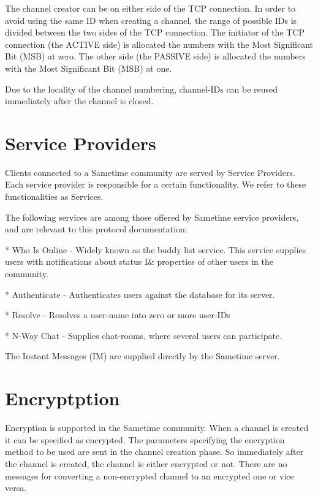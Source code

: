 \documentclass[titlepage,oneside]{book}
\begin{document}
\par{} The channel creator can be on either side of the TCP
connection. In order to avoid using the same ID when creating a
channel, the range of possible IDs is divided between the two sides of
the TCP connection.  The initiator of the TCP connection (the ACTIVE
side) is allocated the numbers with the Most Significant Bit (MSB) at
zero. The other side (the PASSIVE side) is allocated the numbers with
the Most Significant Bit (MSB) at one.

\par{} Due to the locality of the channel numbering, channel-IDs can
be reused immediately after the channel is closed.

\section{Service Providers}

\par{} Clients connected to a Sametime community are served by Service
Providers. Each service provider is responsible for a certain
functionality. We refer to these functionalities as Services.

\par{} The following services are among those offered by Sametime
service providers, and are relevant to this protocol documentation:

\par{} * Who Is Online - Widely known as the buddy list service. This
service supplies users with notifications about status I\& properties of
other users in the community.

\par{} * Authenticate - Authenticates users against the database for
its server.

\par{} * Resolve - Resolves a user-name into zero or more user-IDs

\par{} * N-Way Chat - Supplies chat-rooms, where several users can
participate.

\par{} The Instant Messages (IM) are supplied directly by the Sametime
server.

\section{Encryptption}

\par{} Encryption is supported in the Sametime community. When a
channel is created it can be specified as encrypted. The parameters
specifying the encryption method to be used are sent in the channel
creation phase. So immediately after the channel is created, the
channel is either encrypted or not. There are no messages for
converting a non-encrypted channel to an encrypted one or vice versa.
\end{document}
